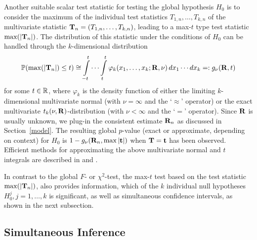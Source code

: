 \documentclass[12pt,a4paper]{article}
\begin{document}
Another suitable scalar test statistic for testing the global hypothesis $H_0
$ is to consider the maximum of the individual test statistics $T_{1,n}, \dots,
T_{k,n}$ of the multivariate statistic $\mathbf{T}_n = (T_{1,n}, \dots, T_{k,n})$, leading to a max-$t$ type
test statistic $\max(|\mathbf{T}_n|)$. The distribution of this statistic under the
conditions of $H_0$ can be handled through the $k$-dimensional distribution 
\begin{eqnarray}  \label{maxt}
\mathbb{P}(\max(|\mathbf{T}_n|) \le t) \cong \int\limits_{-t}^t \cdots \int\limits_{t}^t
\varphi_k(x_1, \dots, x_k; \mathbf{R}, \nu) \, dx_1 \cdots dx_k =: g_\nu(\mathbf{R}, t)
\end{eqnarray}
for some $t \in \mathbb{R}$, where $\varphi_k$ is the density function of either the
limiting $k$-dimensional multivariate normal (with $\nu = \infty$ and the `$%
\approx$' operator) or the exact multivariate $t_k(\nu, \mathbf{R})$-distribution
(with $\nu < \infty$ and the `$=$' operator). Since $\mathbf{R}$ is usually
unknown, we plug-in the consistent estimate $\mathbf{R}_n$ as discussed in
Section~\ref{model}.
The resulting global $p$-value 
(exact or approximate, depending on context) 
for $H_0$ is $1 - g_\nu(\mathbf{R}_n, \max|\mathbf{t}|)$ when $\mathbf{T} = \mathbf{t}$ has been observed. 
Efficient methods
for approximating the above multivariate normal and $t$ integrals are
described in \cite{Genz1992,GenzBretz1999,BretzGenzHothorn2001} and \cite%
{GenzBretz2002}. %

In contrast to the global $F$- or $\chi^2$-test, the max-$t$ test
based on the test statistic $\max(|\mathbf{T}_n|)$, also provides information, 
which of the $k$ individual null hypotheses $%
H_0^j, j = 1, \dots, k$ is significant,
as well as simultaneous confidence intervals, as shown in the next
subsection.

\subsection{Simultaneous Inference}

\label{simtest} %
\end{document}
